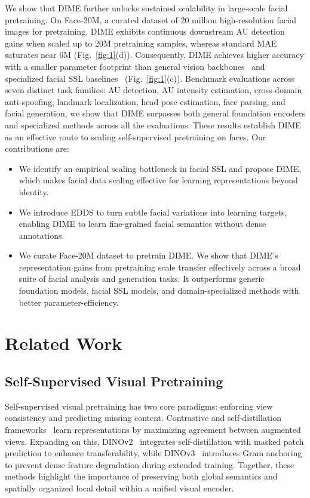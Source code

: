 \documentclass[10pt,journal,compsoc]{IEEEtran}
\begin{document}
We show that DIME further unlocks sustained scalability in large-scale facial pretraining. On Face-20M, a curated dataset of 20 million high-resolution facial images for pretraining, DIME exhibits continuous downstream AU detection gains when scaled up to 20M pretraining samples, whereas standard MAE saturates near 6M (Fig.~\ref{fig:1}(d)). Consequently, DIME achieves higher accuracy with a smaller parameter footprint than general vision backbones~\cite{simeoni2025dinov3,he2022masked,liu2022mixmim,woo2023convnext} and specialized facial SSL baselines~\cite{ning2024representation,ma2024facial} (Fig.~\ref{fig:1}(c)). Benchmark evaluations across seven distinct task families: AU detection, AU intensity estimation, cross-domain anti-spoofing, landmark localization, head pose estimation, face parsing, and facial generation, we show that DIME surpasses both general foundation encoders and specialized methods across all the evaluations. These results establish DIME as an effective route to scaling self-supervised pretraining on faces. Our contributions are:
\begin{itemize}
\item We identify an empirical scaling bottleneck in facial SSL and propose DIME, which makes facial data scaling effective for learning representations beyond identity.

\item We introduce EDDS to turn subtle facial variations into learning targets, enabling DIME to learn fine-grained facial semantics without dense annotations.

\item We curate Face-20M dataset to pretrain DIME. We show that DIME's representation gains from pretraining scale transfer effectively across a broad suite of facial analysis and generation tasks. It outperforms generic foundation models, facial SSL models, and domain-specialized methods with better parameter-efficiency. 
\end{itemize}

\section{Related Work}
\label{sec:related_work}

\subsection{Self-Supervised Visual Pretraining}
\label{sec:related_ssl}

Self-supervised visual pretraining has two core paradigms: enforcing view consistency and predicting missing content. Contrastive and self-distillation frameworks~\cite{chen2020simple,caron2021emerging} learn representations by maximizing agreement between augmented views. Expanding on this, DINOv2~\cite{oquab2023dinov2} integrates self-distillation with masked patch prediction to enhance transferability, while DINOv3~\cite{simeoni2025dinov3} introduces Gram anchoring to prevent dense feature degradation during extended training. Together, these methods highlight the importance of preserving both global semantics and spatially organized local detail within a unified visual encoder.
\end{document}
